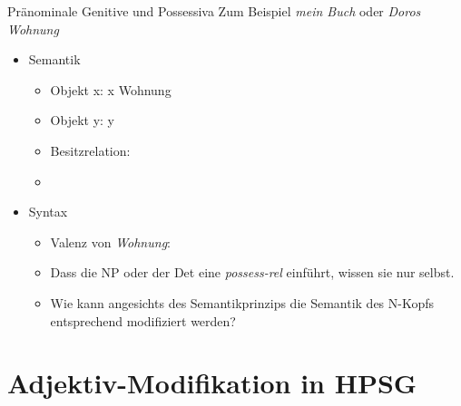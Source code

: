 \begin{frame}
  {Pränominale Genitive und Possessiva}
  \onslide<+->
  \onslide<+->
  Zum Beispiel \alert{\textit{mein Buch}} oder \alert{\textit{Doros Wohnung}}\\
  \Halbzeile
  \begin{itemize}[<+->]
    \item Semantik
      \Viertelzeile
      \begin{itemize}[<+->]
        \item Objekt x: x  Wohnung
        \item Objekt y: y 
        \item Besitzrelation: 
        \item %
      \end{itemize}
      \Halbzeile
    \item Syntax
      \begin{itemize}[<+->]
        \item Valenz von \textit{Wohnung}: %
        \item Dass die NP oder der Det eine \textit{possess-rel} einführt, wissen sie nur selbst.
        \item Wie kann angesichts des \alert{Semantikprinzips} die Semantik des N-Kopfs\\
          entsprechend modifiziert werden?
      \end{itemize}
  \end{itemize}
\end{frame}


\section{Adjektiv-Modifikation in HPSG}

